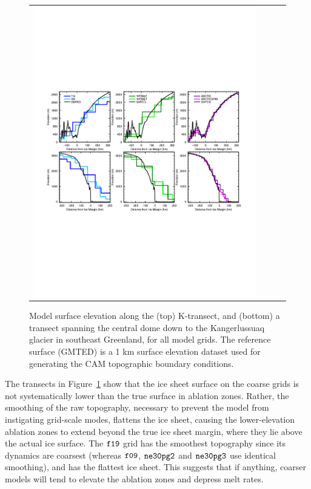 \documentclass[draft]{agujournal2019}
\begin{document}
\begin{figure}[t]
\begin{center}
\begin{tabular}{cccc}
         \includegraphics[width=130mm]{figs/temp_zsects.pdf}
\end{tabular}
\end{center}
\caption{Model surface elevation along the (top) K-transect, and (bottom) a transect spanning the central dome down to the Kangerlussuaq glacier in southeast Greenland, for all model grids. The reference surface (GMTED) is a 1 km surface elevation dataset used for generating the CAM topographic boundary conditions. }
\label{fig:ztrans}
\end{figure}

The transects in Figure~\ref{fig:ztrans} show that the ice sheet surface on the coarse grids is not systematically lower than the true surface in ablation zones. Rather, the smoothing of the raw topography, necessary to prevent the model from instigating grid-scale modes, flattens the ice sheet, causing the lower-elevation ablation zones to extend beyond the true ice sheet margin, where they lie above the actual ice surface. The $\tt f19$ grid has the smoothest topography since its dynamics are coarsest (whereas $\tt f09$, $\tt ne30pg2$ and $\tt ne30pg3$ use identical smoothing), and has the flattest ice sheet. This suggests that if anything, coarser models will tend to elevate the ablation zones and depress melt rates.
\end{document}
